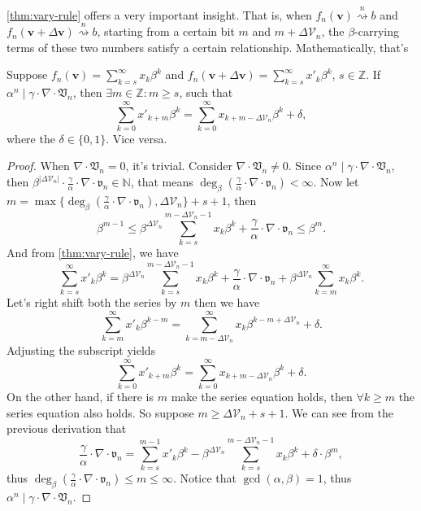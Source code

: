 \cref{thm:vary-rule} offers a very important insight.
That is, when $f_{n}(\bm{v})\overset{n}{\rightsquigarrow} b$ and $f_{n}(\bm{v} + \Delta\bm{v}) \overset{n}{\rightsquigarrow} b$, starting from a certain bit $m$ and $m + \Delta\mathcal{V}_n$, the $\beta$-carrying terms of these two numbers satisfy a certain relationship. Mathematically, that's
\begin{corollary}\label{cor:high-order-bits-sync}
    Suppose $f_{n}(\bm{v}) = \sum_{k=s}^{\infty}x_k\beta^{k}$ and $f_{n}(\bm{v} + \Delta\bm{v}) = \sum_{k=s}^{\infty}x'_k\beta^{k}$, $s\in\mathbb{Z}$. If $\alpha^{n} \mid \gamma\cdot\nabla\cdot\mathfrak{V}_{n}$, then $\exists m \in \mathbb{Z}: m \ge s$, such that
    \[ \sum_{k=0}^{\infty}x'_{k + m}\beta^{k} = \sum_{k=0}^{\infty}x_{k + m - \Delta\mathcal{V}_n}\beta^{k} + \delta, \]
    where the $\delta\in\{0, 1\}$. Vice versa.
\end{corollary}
\begin{proof}
    When $\nabla\cdot\mathfrak{V}_{n} = 0$, it's trivial. Consider $\nabla\cdot\mathfrak{V}_{n} \ne 0$.\newline
    Since $\alpha^{n} \mid \gamma\cdot\nabla\cdot\mathfrak{V}_{n}$, then $\beta^{\vert\Delta\mathcal{V}_n\vert}\cdot\frac{\gamma}{\alpha}\cdot\nabla\cdot\mathfrak{v}_{n} \in \mathbb{N}$, that means $\deg_{\beta}(\frac{\gamma}{\alpha}\cdot\nabla\cdot\mathfrak{v}_{n})<\infty$. Now let $m = \max\{\deg_{\beta}(\frac{\gamma}{\alpha}\cdot\nabla\cdot\mathfrak{v}_{n}), \Delta\mathcal{V}_n\} + s + 1$, then
    \[ \beta^{m - 1}\le\beta^{\Delta\mathcal{V}_n}\sum_{k=s}^{m - \Delta\mathcal{V}_n - 1}x_k\beta^{k} + \frac{\gamma}{\alpha}\cdot\nabla\cdot\mathfrak{v}_{n} \le \beta^{m}. \]
    And from \cref{thm:vary-rule}, we have
    \[ \sum_{k=s}^{\infty}x'_k\beta^{k} = \beta^{\Delta\mathcal{V}_n}\sum_{k=s}^{m - \Delta\mathcal{V}_n - 1}x_k\beta^{k} + \frac{\gamma}{\alpha}\cdot\nabla\cdot\mathfrak{v}_{n} + \beta^{\Delta\mathcal{V}_n}\sum_{k=m}^{\infty}x_{k}\beta^{k}. \]
    Let's right shift both the series by $m$ then we have
    \[ \sum_{k=m}^{\infty}x'_k\beta^{k - m} = \sum_{k=m - \Delta\mathcal{V}_n}^{\infty}x_{k}\beta^{k-m + \Delta\mathcal{V}_{n}} + \delta. \]
    Adjusting the subscript yields
    \[ \sum_{k=0}^{\infty}x'_{k + m}\beta^{k} = \sum_{k=0}^{\infty}x_{k + m - \Delta\mathcal{V}_n}\beta^{k} + \delta. \]
    On the other hand, if there is $m$ make the series equation holds, then $\forall k \ge m$ the series equation also holds. So suppose $m \ge \Delta\mathcal{V}_n + s + 1$. We can see from the previous derivation that
    \[\frac{\gamma}{\alpha}\cdot\nabla\cdot\mathfrak{v}_{n} = \sum_{k=s}^{m-1}x'_k\beta^{k} - \beta^{\Delta\mathcal{V}_n}\sum_{k=s}^{m - \Delta\mathcal{V}_n - 1}x_k\beta^{k} + \delta\cdot\beta^{m}, \]
    thus $\deg_{\beta}(\frac{\gamma}{\alpha}\cdot\nabla\cdot\mathfrak{v}_{n}) \le m \le\infty$. Notice that $\gcd(\alpha, \beta) = 1$, thus $\alpha^{n}\mid \gamma\cdot\nabla\cdot\mathfrak{V}_{n}$.
\end{proof}
